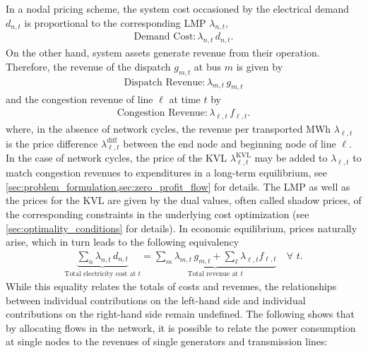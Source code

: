 \documentclass[11pt,twocolumn]{article}
\newcommand{\Forall}[1]{\hspace{10pt} \forall \,\, #1 }
\newcommand{\nodalgeneration}[1][n]{g_{#1,t}}
\newcommand{\flow}{f_{\ell,t}}
\newcommand{\lmp}[1][n]{\lambda_{#1,t}}
\newcommand{\lmpdiff}[1][\ell]{\lmp[#1]^\text{diff}}
\newcommand{\lmpkvl}[1][\ell]{\lmp[#1]^\text{KVL}}
\newcommand{\demand}[1][n]{d_{#1,t}}
\newcommand{\incidence}[1][n]{K_{#1,\ell}}
\begin{document}
In a nodal pricing scheme, the system cost occasioned by the electrical demand $\demand$ is proportional to the corresponding \ac{LMP} $\lmp$, 
\begin{align}
    \text{Demand Cost}: \lmp\, \demand .
    \label{eq:demand_cost}
\end{align}
On the other hand, system assets generate revenue from their operation. Therefore, the revenue of the dispatch $\nodalgeneration[m]$ at bus $m$ is given by 
\begin{align}
    \text{Dispatch Revenue}: \lmp[m] \, \nodalgeneration[m] 
    \label{eq:dispatch_revenue}
\end{align}
and the congestion revenue of line $\ell$ at time $t$ by 
\begin{align}
    \text{Congestion Revenue}: \lmp[\ell]\, \flow .
    \label{eq:congestion_revenue}
\end{align}
where, in the absence of network cycles, the revenue per transported MWh $\lmp[\ell]$ is the price difference $\lmpdiff$ between the end node and beginning node of line $\ell$. In the case of network cycles, the price of the \ac{KVL} $\lmpkvl$ may be added to $\lmp[\ell]$ to match congestion revenues to expenditures in a long-term equilibrium, see \cref{sec:problem_formulation,sec:zero_profit_flow} for details. The \ac{LMP} as well as the prices for the \ac{KVL} are given by the dual values, often called shadow prices, of the corresponding constraints in the underlying cost optimization (see \cref{sec:optimality_conditions} for details).   
In economic equilibrium, prices naturally arise, which in turn leads to the following equivalency
\begin{align}
    \underbrace{\sum_{n} \lmp\, \demand}_{\text{Total electricity cost at $t$}}  = \underbrace{\sum_{m} \lmp[m]\, \nodalgeneration[m] + \sum_{\ell} \lmp[\ell] \flow}_{\text{Total revenue at $t$}}\, \Forall{t} .
    \label{eq:total-demand-cost}
\end{align}
While this equality relates the totals of costs and revenues, the relationships between individual contributions on the left-hand side and individual contributions on the right-hand side remain undefined. The following shows that by allocating flows in the network, it is possible to relate the power consumption at single nodes to the revenues of single generators and transmission lines: 
\end{document}

